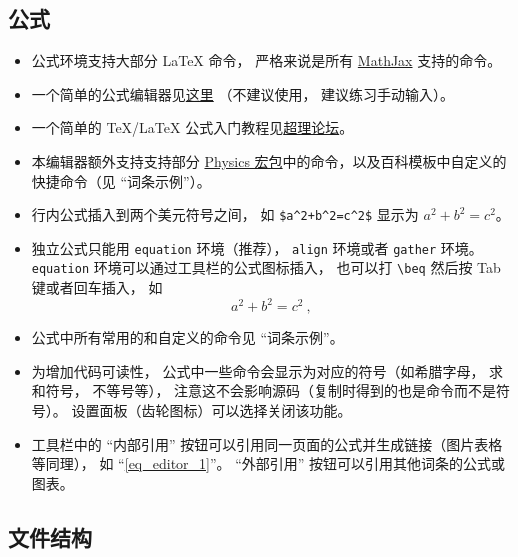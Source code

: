 \subsection{公式}
\begin{itemize}
\item 公式环境支持大部分 LaTeX 命令， 严格来说是所有 \href{https://www.mathjax.org/}{MathJax} 支持的命令。
\item 一个简单的公式编辑器见\href{https://www.codecogs.com/latex/eqneditor.php}{这里} （不建议使用， 建议练习手动输入）。
\item 一个简单的 TeX/LaTeX 公式入门教程见\href{https://chaoli.club/index.php/211}{超理论坛}。
\item 本编辑器额外支持支持部分 \href{http://mirrors.ibiblio.org/CTAN/macros/latex/contrib/physics/physics.pdf}{Physics 宏包}中的命令，以及百科模板中自定义的快捷命令（见 “词条示例”）。
\item 行内公式插入到两个美元符号之间， 如 \verb|$a^2+b^2=c^2$| 显示为 $a^2 + b^2 = c^2$。
\item 独立公式只能用 \verb|equation| 环境（推荐）， \verb|align| 环境或者 \verb|gather| 环境。 \verb|equation| 环境可以通过工具栏的公式图标插入， 也可以打 \verb|\beq| 然后按 Tab 键或者回车插入， 如
\begin{equation}\label{eq_editor_1}
a^2 + b^2 = c^2~,
\end{equation}
\item 公式中所有常用的和自定义的命令见 “词条示例”。
\item 为增加代码可读性， 公式中一些命令会显示为对应的符号（如希腊字母， 求和符号， 不等号等）， 注意这不会影响源码（复制时得到的也是命令而不是符号）。 设置面板（齿轮图标）可以选择关闭该功能。
\item 工具栏中的 “内部引用” 按钮可以引用同一页面的公式并生成链接（图片表格等同理）， 如 “\autoref{eq_editor_1}”。 “外部引用” 按钮可以引用其他词条的公式或图表。
\end{itemize}

\subsection{文件结构}

